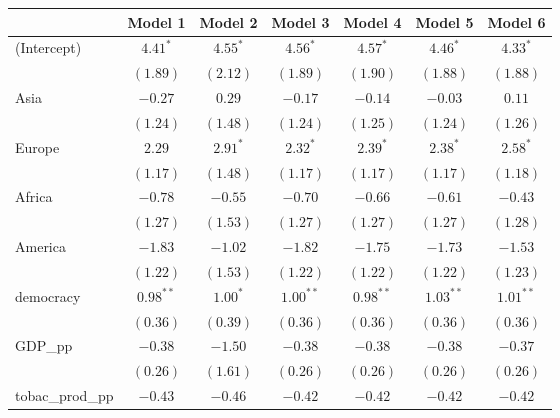 
\begin{table}[!h]
\begin{center}
\begin{tabular}{l c c c c c c }
\toprule
 & Model 1 & Model 2 & Model 3 & Model 4 & Model 5 & Model 6 \\
\midrule
(Intercept)             & $4.41^{*}$   & $4.55^{*}$   & $4.56^{*}$   & $4.57^{*}$   & $4.46^{*}$   & $4.33^{*}$   \\
                        & $(1.89)$     & $(2.12)$     & $(1.89)$     & $(1.90)$     & $(1.88)$     & $(1.88)$     \\
Asia                    & $-0.27$      & $0.29$       & $-0.17$      & $-0.14$      & $-0.03$      & $0.11$       \\
                        & $(1.24)$     & $(1.48)$     & $(1.24)$     & $(1.25)$     & $(1.24)$     & $(1.26)$     \\
Europe                  & $2.29$       & $2.91^{*}$   & $2.32^{*}$   & $2.39^{*}$   & $2.38^{*}$   & $2.58^{*}$   \\
                        & $(1.17)$     & $(1.48)$     & $(1.17)$     & $(1.17)$     & $(1.17)$     & $(1.18)$     \\
Africa                  & $-0.78$      & $-0.55$      & $-0.70$      & $-0.66$      & $-0.61$      & $-0.43$      \\
                        & $(1.27)$     & $(1.53)$     & $(1.27)$     & $(1.27)$     & $(1.27)$     & $(1.28)$     \\
America                 & $-1.83$      & $-1.02$      & $-1.82$      & $-1.75$      & $-1.73$      & $-1.53$      \\
                        & $(1.22)$     & $(1.53)$     & $(1.22)$     & $(1.22)$     & $(1.22)$     & $(1.23)$     \\
democracy               & $0.98^{**}$  & $1.00^{*}$   & $1.00^{**}$  & $0.98^{**}$  & $1.03^{**}$  & $1.01^{**}$  \\
                        & $(0.36)$     & $(0.39)$     & $(0.36)$     & $(0.36)$     & $(0.36)$     & $(0.36)$     \\
GDP\_pp                 & $-0.38$      & $-1.50$      & $-0.38$      & $-0.38$      & $-0.38$      & $-0.37$      \\
                        & $(0.26)$     & $(1.61)$     & $(0.26)$     & $(0.26)$     & $(0.26)$     & $(0.26)$     \\
tobac\_prod\_pp         & $-0.43$      & $-0.46$      & $-0.42$      & $-0.42$      & $-0.42$      & $-0.42$      \\

\end{tabular}
\end{center}
\end{table}
